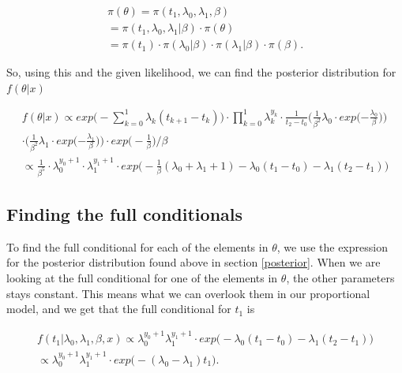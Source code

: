 \begin{align}
    \pi(\theta) 
    = \pi(t_1, \lambda_0, \lambda_1, \beta) \nonumber \\
    = \pi(t_1, \lambda_0, \lambda_1 | \beta) \cdot \pi(\theta) \nonumber \\
    = \pi(t_1) \cdot \pi(\lambda_0|\beta) \cdot \pi(\lambda_1|\beta) \cdot \pi(\beta).
\end{align}

So, using this and the given likelihood, we can find the posterior distribution for $f(\theta|x)$

\begin{align} \label{eq:post}
    f(\theta|x) \propto exp \Big( - \sum_{k = 0}^1 \lambda_k (t_{k+1} - t_k) \Big)\cdot \prod_{k = 0}^1 \lambda_k^{y_k} \cdot \frac{1}{t_2-t_0} 
    \Big( \frac{1}{\beta^2} \lambda_0 \cdot
    exp \Big({-\frac{\lambda_0}{\beta}} \Big)  \Big) \nonumber \\ 
    \cdot \Big( \frac{1}{\beta^2} \lambda_1 \cdot exp \Big({-\frac{\lambda_1}{\beta}} \Big) \Big) \cdot exp \Big( -\frac{1}{\beta} \Big)/\beta \nonumber \\
    \propto   \frac{1}{\beta^5} \cdot \lambda_0^{y_0 + 1} \cdot \lambda_1^{y_1 + 1} \cdot exp \Big( -\frac{1}{\beta}(\lambda_0 + \lambda_1 + 1) - \lambda_0(t_1-t_0) - \lambda_1(t_2-t_1) \Big)
\end{align}


\subsection{Finding the full conditionals} \label{full_cond}

To find the full conditional for each of the elements in $\theta$, we use the expression for the posterior distribution found above in section \ref{posterior}. When we are looking at the full conditional for one of the elements in $\theta$, the other parameters stays constant. This means what we can overlook them in our proportional model, and we get that the full conditional for $t_1$ is

\begin{align}
    f(t_1 | \lambda_0, \lambda_1, \beta, x) \propto 
    \lambda_0^{y_0 + 1} \lambda_1^{y_1 + 1} \cdot exp \Big( -\lambda_0(t_1 - t_0) - \lambda_1 (t_2 - t_1) \Big) \nonumber \\
    \propto  \lambda_0^{y_0 + 1} \lambda_1^{y_1 + 1} \cdot exp \Big( -(\lambda_0 - \lambda_1)t_1 \Big).
\end{align}

